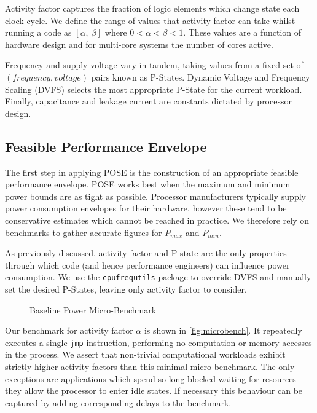 Activity factor captures the fraction of logic elements which change state each clock cycle.
We define the range of values that activity factor can take whilst running a code as $[\alpha,~\beta]$ where $0 < \alpha < \beta < 1$. These values are a function of hardware design and for multi-core systems the number of cores active.

Frequency and supply voltage vary in tandem, taking values from a fixed set of $(frequency, voltage)$ pairs known as P-States.
Dynamic Voltage and Frequency Scaling (DVFS) selects the most appropriate P-State for the current workload.
Finally, capacitance and leakage current are constants dictated by processor design.

\subsection{Feasible Performance Envelope}
The first step in applying POSE is the construction of an appropriate feasible performance envelope.
POSE works best when the maximum and minimum power bounds are as tight as possible.
Processor manufacturers typically supply power consumption envelopes for their hardware, however these tend to be conservative estimates which cannot be reached in practice.
We therefore rely on benchmarks to gather accurate figures for $P_{max}$ and $P_{min}$.

As previously discussed, activity factor and P-state are the only properties through which code (and hence performance engineers) can influence power consumption.
We use the \texttt{cpufrequtils} package to override DVFS and manually set the desired P-States, leaving only activity factor to consider.

\begin{figure}[ht]                                                               
\centering                                                                      
\lstset{basicstyle=\ttfamily\footnotesize\bfseries, frame=tb} %
              
\caption{Baseline Power Micro-Benchmark}                            
\label{fig:microbench}                                                           
\end{figure}  

Our benchmark for activity factor $\alpha$ is shown in \autoref{fig:microbench}.
It repeatedly executes a single \texttt{jmp} instruction, performing no computation or memory accesses in the process.
We assert that non-trivial computational workloads exhibit strictly higher activity factors than this minimal micro-benchmark.
The only exceptions are applications which spend so long blocked waiting for resources they allow the processor to enter idle states.
If necessary this behaviour can be captured by adding corresponding delays to the benchmark.

